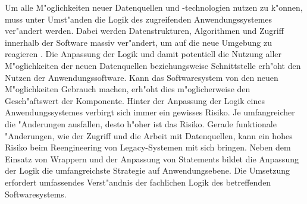 Um alle M"oglichkeiten neuer Datenquellen und -technologien nutzen zu k"onnen, muss unter Umst"anden die Logik des zugreifenden Anwendungssystemes ver"andert werden. Dabei werden Datenstrukturen, Algorithmen und Zugriff innerhalb der Software massiv ver"andert, um auf die neue Umgebung zu reagieren \citep{henrard-2002}.
\lb
Die Anpassung der Logik und damit potentiell die Nutzung aller M"oglichkeiten der neuen Datenquellen beziehungsweise Schnittstelle erh"oht den Nutzen der Anwendungssoftware. Kann das Softwaresystem von den neuen M"oglichkeiten Gebrauch machen, erh"oht dies m"oglicherweise den Gesch"aftswert der Komponente. 
\lb
Hinter der Anpassung der Logik eines Anwendungssystemes verbirgt sich immer ein gewisses Risiko. Je umfangreicher die "Anderungen ausfallen, desto h"oher ist das Risiko. Gerade funktionale "Anderungen, wie der Zugriff und die Arbeit mit Datenquellen, kann ein hohes Risiko beim Reengineering von Legacy-Systemen mit sich bringen.
\lb
Neben dem Einsatz von Wrappern und der Anpassung von Statements bildet die Anpassung der Logik die umfangreichste Strategie auf Anwendungsebene. Die Umsetzung erfordert umfassendes Verst"andnis der fachlichen Logik des betreffenden Softwaresystems. %
